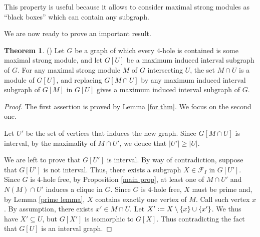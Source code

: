 \documentclass{article}
\theoremstyle{definition}
\newtheorem{thm}{Theorem}
\newcommand{\defeq}{\vcentcolon=}
\begin{document}
    This property is useful because
    it allows to consider maximal
    strong modules as
    ``black boxes''
    which can contain any subgraph. 
    
    We are now ready to prove an
    important result.
    
    \begin{thm} (\cite{main}) \label{replacing thm}
        Let $G$ be a graph of which
        every $4$-hole is contained
        is some maximal strong module,
        and let $G\left[U\right]$ be a
        maximum induced interval
        subgraph of $G$.
        For any maximal strong module
        $M$ of $G$ intersecting $U$,
        the set $M \cap U$ is a module
        of $G\left[U\right]$, 
        and replacing $G\left[M \cap U \right]$ 
        by any maximum induced 
        interval subgraph of $G\left[M\right]$ 
        in $G\left[U\right]$ 
        gives a maximum induced interval
        subgraph of $G$.
    \end{thm}
    \begin{proof}
        The first assertion is proved
        by Lemma \ref{for thm}.
        We focus on the second one.

        Let $U'$  be the set of 
        vertices that induces the new graph.
        Since $G\left[M \cap U\right]$ is
        interval, by the maximality of
        $M \cap U'$, we deuce that
        $\left|U'\right| \geq \left|U\right|$.

        We are left to prove that
        $G\left[U'\right]$ is interval.
        By way of contradiction,
        suppose that $G\left[U'\right]$ 
        is not interval.
        Thus, there exists a
        subgraph $X \in \mathcal{F}_{I}$
        in $G\left[U'\right]$.
        Since $G$ is $4$-hole free, 
        by Proposition \ref{main prop},
        at least one of $M \cap U'$ 
        and $N\left(M\right) \cap U'$ 
        induces a clique in $G$.
        Since $G$ is $4$-hole free,
        $X$ must be prime and,
        by Lemma \ref{prime lemma},
        $X$ contains exactly
        one vertex of $M$.
        Call such vertex $x$.
        By assumption, 
        there exists $x' \in M \cap U$.
        Let $X' \defeq X \setminus \left\{x\right\} \cup \left\{x'\right\}$.
        We thus have $X' \subseteq U$,
        but $G\left[X'\right]$ is 
        isomorphic to $G\left[X\right]$.
        Thus contradicting the fact
        that $G\left[U\right]$ is an
        interval graph.
    \end{proof}
\end{document}
